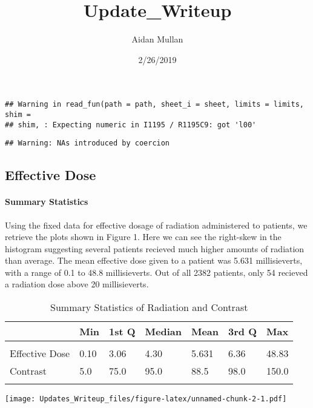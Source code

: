 \documentclass[]{article}
\title{Update\_Writeup}
\author{Aidan Mullan}
\date{2/26/2019}
\let\oldparagraph\paragraph
\renewcommand{\paragraph}[1]{\oldparagraph{#1}\mbox{}}
\begin{document}
\maketitle

\begin{verbatim}
## Warning in read_fun(path = path, sheet_i = sheet, limits = limits, shim =
## shim, : Expecting numeric in I1195 / R1195C9: got 'l00'
\end{verbatim}

\begin{verbatim}
## Warning: NAs introduced by coercion
\end{verbatim}

\subsection{Effective Dose}\label{effective-dose}

\paragraph{Summary Statistics}\label{summary-statistics}

Using the fixed data for effective dosage of radiation administered to
patients, we retrieve the plots shown in Figure 1. Here we can see the
right-skew in the histogram suggesting several patients recieved much
higher amounts of radiation than average. The mean effective dose given
to a patient was 5.631 millisieverts, with a range of 0.1 to 48.8
millisieverts. Out of all 2382 patients, only 54 recieved a radiation
dose above 20 millisieverts.

\begin{table}[H] \centering 
  \caption{Summary Statistics of Radiation and Contrast} 
\begin{tabular}{p{3cm}p{1cm}p{1cm}p{1cm}p{1cm}p{1cm}p{1cm}}
\\[-1.8ex] \hline 
\hline
 & Min & 1st Q & Median & Mean & 3rd Q & Max \\ 
\hline \\[-1.8ex] 
Effective Dose & 0.10 & 3.06 & 4.30 & 5.631 & 6.36 & 48.83 \\
Contrast       & 5.0 & 75.0 & 95.0 & 88.5 & 98.0 & 150.0 \\
\hline 
\hline \\[-1.8ex]
 \end{tabular}
\end{table}

\texttt{[image: Updates\_Writeup\_files/figure-latex/unnamed-chunk-2-1.pdf]}
\end{document}
